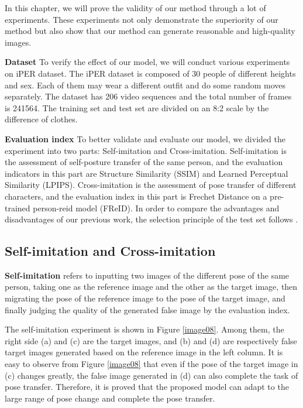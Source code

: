 In this chapter, we will prove the validity of our method through a lot of experiments. These experiments not only demonstrate the superiority of our method but also show that our method can generate reasonable and high-quality images.

\textbf{Dataset} To verify the effect of our model, we will conduct various experiments on iPER dataset. The iPER \cite{liu2019liquid} dataset is composed of 30 people of different heights and sex. Each of them may wear a different outfit and do some random moves separately. The dataset has 206 video sequences and the total number of frames is 241564. The training set and test set are divided on an 8:2 scale by the difference of clothes.
	
\textbf{Evaluation index} To better validate and evaluate our model, we divided the experiment into two parts: Self-imitation and Cross-imitation. Self-imitation is the assessment of self-posture transfer of the same person, and the evaluation indicators in this part are Structure Similarity (SSIM) and Learned Perceptual Similarity (LPIPS). Cross-imitation is the assessment of pose transfer of different characters, and the evaluation index in this part is Frechet Distance on a pre-trained person-reid model (FReID). In order to compare the advantages and disadvantages of our previous work, the selection principle of the test set follows \cite{liu2019liquid}.
	
\subsection{Self-imitation and Cross-imitation}
	
\textbf{Self-imitation} refers to inputting two images of the different pose of the same person, taking one as the reference image and the other as the target image, then migrating the pose of the reference image to the pose of the target image, and finally judging the quality of the generated false image by the evaluation index.
	
The self-imitation experiment is shown in Figure \ref{image08}. Among them, the right side (a) and (c) are the target images, and (b) and (d) are respectively false target images generated based on the reference image in the left column. It is easy to observe from Figure \ref{image08} that even if the pose of the target image in (c) changes greatly, the false image generated in (d) can also complete the task of pose transfer. Therefore, it is proved that the proposed model can adapt to the large range of pose change and complete the pose transfer.
	
